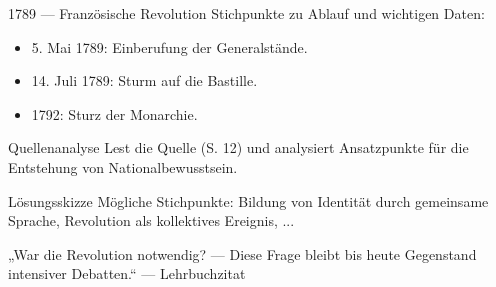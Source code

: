 \documentclass[11pt,a4paper,oneside]{article}
\begin{document}
	\begin{timeline}{1789 — Französische Revolution}
		Stichpunkte zu Ablauf und wichtigen Daten:
		\begin{itemize}
			\item 5. Mai 1789: Einberufung der Generalstände.
			\item 14. Juli 1789: Sturm auf die Bastille.
			\item 1792: Sturz der Monarchie.
		\end{itemize}
	\end{timeline}
	
	\begin{histaufgabe}{Quellenanalyse}
		Lest die Quelle (S. 12) und analysiert Ansatzpunkte für die Entstehung von Nationalbewusstsein.
	\end{histaufgabe}
	
	\begin{histloesung}{Lösungsskizze}
		Mögliche Stichpunkte: Bildung von Identität durch gemeinsame Sprache, Revolution als kollektives Ereignis, ...
	\end{histloesung}
	
	\begin{quoteBox}
		„War die Revolution notwendig? — Diese Frage bleibt bis heute Gegenstand intensiver Debatten.“ — Lehrbuchzitat
	\end{quoteBox}
	
\end{document}

